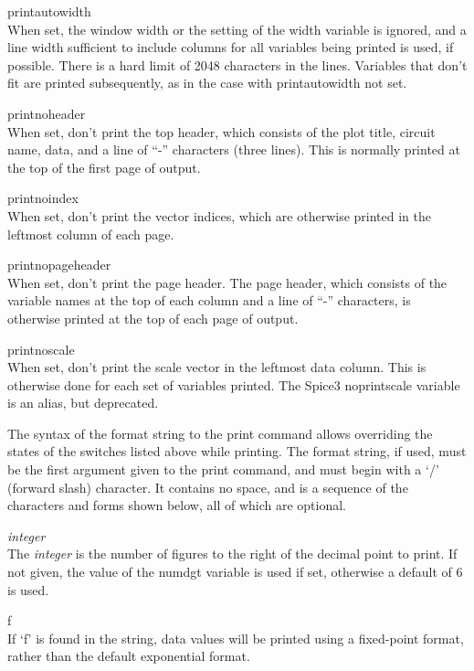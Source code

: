 \begin{description}
\item{\et printautowidth}\\
When set, the window width or the setting of the {\et width} variable
is ignored, and a line width sufficient to include columns for all
variables being printed is used, if possible.  There is a hard limit
of 2048 characters in the lines.  Variables that don't fit are printed
subsequently, as in the case with {\et printautowidth} not set.

\item{\et printnoheader}\\
When set, don't print the top header, which consists of the plot
title, circuit name, data, and a line of ``{\vt -}'' characters (three
lines).  This is normally printed at the top of the first page of
output.

\item{\et printnoindex}\\
When set, don't print the vector indices, which are otherwise printed
in the leftmost column of each page.

\item{\et printnopageheader}\\
When set, don't print the page header.  The page header, which
consists of the variable names at the top of each column and a line of
``{\vt -}'' characters, is otherwise printed at the top of each page
of output.

\item{\et printnoscale}\\
When set, don't print the scale vector in the leftmost data column. 
This is otherwise done for each set of variables printed.  The Spice3
{\et noprintscale} variable is an alias, but deprecated.
\end{description}

The syntax of the format string to the {\cb print} command allows
overriding the states of the switches listed above while printing. 
The format string, if used, must be the first argument given to the
{\cb print} command, and must begin with a `{\vt /}' (forward slash)
character.  It contains no space, and is a sequence of the characters
and forms shown below, all of which are optional.

\begin{description}
\item{\it integer}\\
The {\it integer} is the number of figures to the right of the decimal
point to print.  If not given, the value of the {\et numdgt} variable
is used if set, otherwise a default of 6 is used.

\item{\vt f}\\
If `{\vt f}' is found in the string, data values will be printed using
a fixed-point format, rather than the default exponential format.
\end{description}

